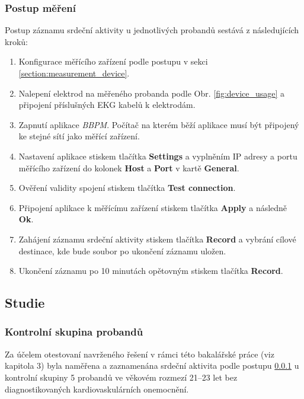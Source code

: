\subsubsection{Postup měření}
\label{section:measurement_process}
Postup záznamu srdeční aktivity u jednotlivých probandů sestává z
následujících kroků:

\begin{enumerate}
    \item Konfigurace měřícího zařízení podle postupu v sekci
          \ref{section:measurement_device}.
    \item Nalepení elektrod na měřeného probanda podle Obr.
          \ref{fig:device_usage} a připojení příslušných EKG kabelů k elektrodám.
    \item Zapnutí aplikace \textit{BBPM}. Počítač na kterém běží aplikace musí
          být připojený ke stejné sítí jako měřící zařízení.
    \item Nastavení aplikace stiskem tlačítka \textbf{Settings} a vyplněním IP
          adresy a portu měřícího zařízení do kolonek \textbf{Host} a \textbf{Port} v
          kartě \textbf{General}.
    \item Ověření validity spojení stiskem tlačítka \textbf{Test connection}.
    \item Připojení aplikace k měřícímu zařízení stiskem tlačítka
          \textbf{Apply} a následně \textbf{Ok}.
    \item Zahájení záznamu srdeční aktivity stiskem tlačítka \textbf{Record} a
          vybrání cílové destinace, kde bude soubor po ukončení záznamu uložen.
    \item Ukončení záznamu po 10 minutách opětovným stiskem tlačítka \textbf{Record}.
\end{enumerate}

\subsection{Studie}
\label{section:study}
\subsubsection{Kontrolní skupina probandů}
\label{section:probands}
Za účelem otestovaní navrženého řešení v rámci této bakalářské práce (viz
kapitola 3) byla naměřena a zaznamenána srdeční aktivita podle postupu
\ref{section:measurement_process} u kontrolní skupiny 5 probandů ve věkovém
rozmezí 21--23 let bez diagnostikovaných kardiovaskulárních onemocnění.

